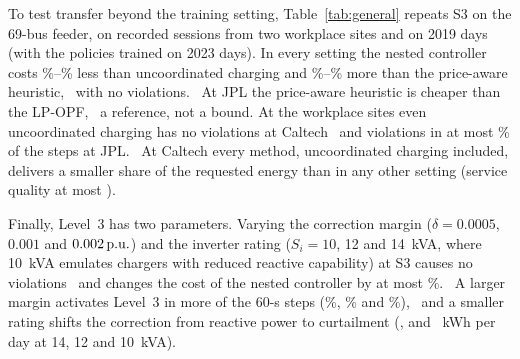 \begin{table}[t]
\centering
\caption{Generalization at 80\% Penetration (\GAuxSeedsWordCap{} Training Seeds). Unc.: Uncoordinated; PA: Price-Aware Heuristic; LP$^\ast$: Perfect-Foresight LP-OPF}
\label{tab:general}
\footnotesize
\setlength{\tabcolsep}{2pt}

\end{table}

To test transfer beyond the training setting, Table~\ref{tab:general} repeats
S3 on the 69-bus feeder, on recorded sessions
from two workplace sites and on 2019 days (with the policies trained on 2023
days). In every setting the
nested controller costs \GGenSavingMin\%--\GGenSavingMax\% less than
uncoordinated charging and \GGenGapMin\%--\GGenGapMax\% more than the
price-aware heuristic,%
\ with no violations.%
\ At JPL the price-aware heuristic is cheaper than the LP-OPF,%
\ a reference, not a bound. At the workplace sites even uncoordinated
charging has no violations at Caltech%
\ and violations in at most \GGenUncViolJpl\% of the steps at JPL.
\ At Caltech every method, uncoordinated charging included, delivers a smaller
share of the requested energy than in any other setting (service quality at
most \GGenSqCaltechMax).%

Finally, Level~3 has two parameters. Varying the correction margin
($\delta=0.0005$, $0.001$ and $0.002\,\mathrm{p.u.}$) and
the inverter rating ($S_i=10$, 12 and \SI{14}{kVA}, where \SI{10}{kVA}
emulates chargers with reduced reactive capability) at S3 causes no
violations%
\ and changes the cost of the nested controller by at most
\GSensCostRange\%.%
\ A larger margin activates Level~3 in more of the 60-s steps
(\GSensDeltaZeroZeroZeroZeroFiveNestedSThreeResidentialIeeeThreeThreeTestQact\%,
\GNestedSThreeQact\% and
\GSensDeltaZeroZeroZeroTwoNestedSThreeResidentialIeeeThreeThreeTestQact\%),%
\ and a smaller rating shifts the correction from reactive power to
curtailment (\GSensSOneFourNestedSThreeResidentialIeeeThreeThreeTestCurt,
\GNestedSThreeCurt{} and
\GSensSOneZeroNestedSThreeResidentialIeeeThreeThreeTestCurt~kWh per day at
14, 12 and \SI{10}{kVA}).%

